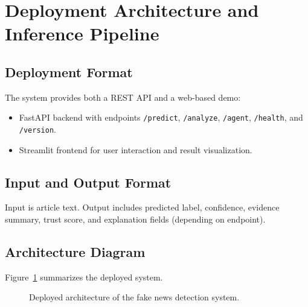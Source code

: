 \documentclass[11pt,a4paper]{article}
\begin{document}
\section{Deployment Architecture and Inference Pipeline}
\subsection{Deployment Format}
The system provides both a REST API and a web-based demo:
\begin{itemize}[leftmargin=1.2em]
  \item FastAPI backend with endpoints \texttt{/predict}, \texttt{/analyze}, \texttt{/agent}, \texttt{/health}, and \texttt{/version}.
  \item Streamlit frontend for user interaction and result visualization.
\end{itemize}

\subsection{Input and Output Format}
Input is article text. Output includes predicted label, confidence, evidence summary, trust score, and explanation fields (depending on endpoint).

\subsection{Architecture Diagram}
Figure~\ref{fig:system-architecture} summarizes the deployed system.

\begin{figure}[H]
\centering
{}
\caption{Deployed architecture of the fake news detection system.}
\label{fig:system-architecture}
\end{figure}
\end{document}
